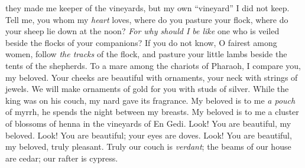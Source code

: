 \begin{biblechapter}
they made me keeper of the vineyards, 
but my own “vineyard” I did not keep.
 Tell me, you whom my \textit{heart} loves, 
where do you pasture your flock, 
where do your sheep lie down at the noon? 
\textit{For why should I be like} one who is veiled 
beside the flocks of your companions?
\verse If you do not know, O fairest among women, 
follow \textit{the tracks} of the flock, 
and pasture your little lambs beside the tents of the shepherds.
 To a mare among the chariots of Pharaoh, 
I compare you, my beloved.
\verse Your cheeks are beautiful with ornaments, 
your neck with strings of jewels.
\verse We will make ornaments of gold for you 
with studs of silver.
 While the king was on his couch, 
my nard gave its fragrance.
\verse My beloved is to me \textit{a pouch} of myrrh, 
he spends the night between my breasts.
\verse My beloved is to me a cluster of blossoms of henna 
in the vineyards of En Gedi.
 Look! You are beautiful, my beloved. 
Look! You are beautiful; 
your eyes are doves.
\verse Look! You are beautiful, my beloved, 
truly pleasant. 
Truly our couch is \textit{verdant};
\verse the beams of our house are cedar; 
our rafter is cypress.
\end{biblechapter}

